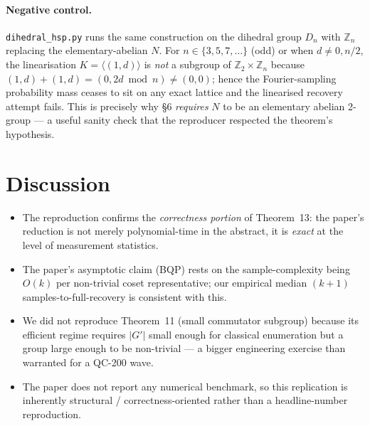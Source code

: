 \documentclass[11pt]{article}
\begin{document}
\paragraph{Negative control.}
\verb|dihedral_hsp.py| runs the same construction on the dihedral group
$D_n$ with $\mathbb{Z}_n$ replacing the elementary-abelian $N$.  For
$n\in\{3,5,7,\ldots\}$ (odd) or when $d\ne 0, n/2$, the linearisation
$K=\langle(1,d)\rangle$ is \emph{not} a subgroup of $\mathbb{Z}_2\times
\mathbb{Z}_n$ because $(1,d)+(1,d)=(0,2d\bmod n)\ne(0,0)$; hence the
Fourier-sampling probability mass ceases to sit on any exact lattice and
the linearised recovery attempt fails.  This is precisely why \S6
\emph{requires} $N$ to be an elementary abelian 2-group — a useful sanity
check that the reproducer respected the theorem's hypothesis.

\section{Discussion}
\begin{itemize}
  \item The reproduction confirms the \emph{correctness portion} of
        Theorem~13: the paper's reduction is not merely
        polynomial-time in the abstract, it is
        \emph{exact} at the level of measurement statistics.
  \item The paper's asymptotic claim (BQP) rests on the sample-complexity
        being $O(k)$ per non-trivial coset representative; our
        empirical median $(k{+}1)$ samples-to-full-recovery is consistent
        with this.
  \item We did not reproduce Theorem~11 (small commutator subgroup)
        because its efficient regime requires $|G'|$ small enough for
        classical enumeration but a group large enough to be non-trivial —
        a bigger engineering exercise than warranted for a QC-200 wave.
  \item The paper does not report any numerical benchmark, so this
        replication is inherently structural / correctness-oriented rather
        than a headline-number reproduction.
\end{itemize}
\end{document}
